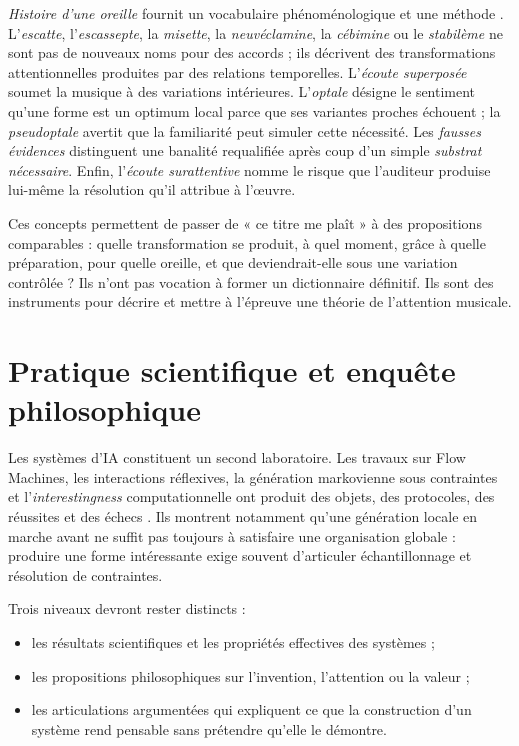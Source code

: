 \documentclass[11pt,a4paper]{article}
\begin{document}
\emph{Histoire d'une oreille} fournit un vocabulaire phénoménologique et une
méthode \parencite{pachet2018oreille}. L'\emph{escatte}, l'\emph{escassepte}, la
\emph{misette}, la \emph{neuvéclamine}, la \emph{cébimine} ou le
\emph{stabilème} ne sont pas de nouveaux noms pour des accords ; ils décrivent
des transformations attentionnelles produites par des relations temporelles.
L'\emph{écoute superposée} soumet la musique à des variations intérieures.
L'\emph{optale} désigne le sentiment qu'une forme est un optimum local parce que
ses variantes proches échouent ; la \emph{pseudoptale} avertit que la familiarité
peut simuler cette nécessité. Les \emph{fausses évidences} distinguent une
banalité requalifiée après coup d'un simple \emph{substrat nécessaire}. Enfin,
l'\emph{écoute surattentive} nomme le risque que l'auditeur produise lui-même la
résolution qu'il attribue à l'œuvre.

Ces concepts permettent de passer de « ce titre me plaît » à des propositions
comparables : quelle transformation se produit, à quel moment, grâce à quelle
préparation, pour quelle oreille, et que deviendrait-elle sous une variation
contrôlée ? Ils n'ont pas vocation à former un dictionnaire définitif. Ils sont
des instruments pour décrire et mettre à l'épreuve une théorie de l'attention
musicale.

\section{Pratique scientifique et enquête philosophique}

Les systèmes d'IA constituent un second laboratoire. Les travaux sur Flow
Machines, les interactions réflexives, la génération markovienne sous contraintes
et l'\emph{interestingness} computationnelle ont produit des objets, des
protocoles, des réussites et des échecs
\parencite{pachet2006clefs,pachet2008machines,pachet2012virtuosity,pachet2021assisted,pachet2026markov}.
Ils montrent notamment qu'une génération locale en marche avant ne suffit pas
toujours à satisfaire une organisation globale : produire une forme intéressante
exige souvent d'articuler échantillonnage et résolution de contraintes.

Trois niveaux devront rester distincts :

\begin{itemize}
  \item les résultats scientifiques et les propriétés effectives des systèmes ;
  \item les propositions philosophiques sur l'invention, l'attention ou la
        valeur ;
  \item les articulations argumentées qui expliquent ce que la construction d'un
        système rend pensable sans prétendre qu'elle le démontre.
\end{itemize}
\end{document}
